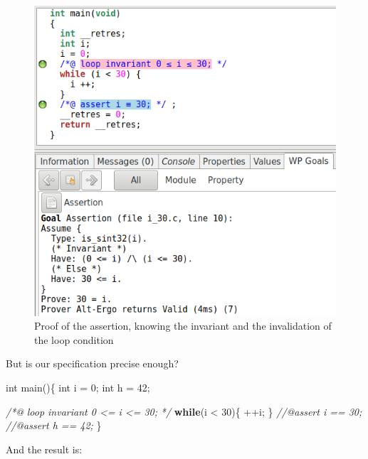 \documentclass[12pt,francais,]{scrbook}
\newenvironment{Shaded}{}{}
\newcommand{\KeywordTok}[1]{\textcolor[rgb]{0.00,0.44,0.13}{\textbf{{#1}}}}
\newcommand{\DataTypeTok}[1]{\textcolor[rgb]{0.56,0.13,0.00}{{#1}}}
\newcommand{\DecValTok}[1]{\textcolor[rgb]{0.25,0.63,0.44}{{#1}}}
\newcommand{\CommentTok}[1]{\textcolor[rgb]{0.38,0.63,0.69}{\textit{{#1}}}}
\newcommand{\NormalTok}[1]{{#1}}
\begin{document}
\begin{figure}[htbp]
\centering
\includegraphics[scale=0.5]{3-3-sortie-boucle.png}
\caption{Proof of the assertion, knowing the invariant and the
  invalidation of the loop condition}
\label{fig:3-3-end_loop}
\end{figure}

But is our specification precise enough?

\begin{footnotesize}\begin{Shaded}
\begin{Highlighting}[]
\DataTypeTok{int} \NormalTok{main()\{}
  \DataTypeTok{int} \NormalTok{i = }\DecValTok{0}\NormalTok{;}
  \DataTypeTok{int} \NormalTok{h = }\DecValTok{42}\NormalTok{;}
  
  \CommentTok{/*@}
\CommentTok{    loop invariant 0 <= i <= 30;}
\CommentTok{  */}
  \KeywordTok{while}\NormalTok{(i < }\DecValTok{30}\NormalTok{)\{}
    \NormalTok{++i;}
  \NormalTok{\}}
  \CommentTok{//@assert i == 30;}
  \CommentTok{//@assert h == 42;}
\NormalTok{\}}
\end{Highlighting}
\end{Shaded}\end{footnotesize}

And the result is:
\end{document}
